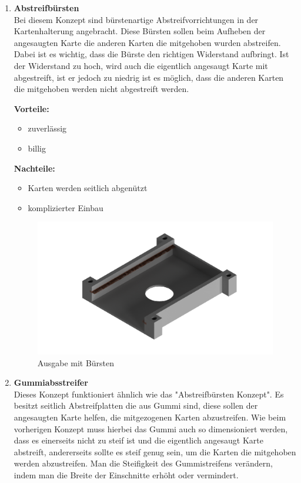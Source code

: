 \begin{enumerate}
    \item \textbf{Abstreifbürsten}\\


Bei diesem Konzept sind bürstenartige Abstreifvorrichtungen in der Kartenhalterung angebracht. Diese Bürsten sollen beim Aufheben der
angesaugten Karte die anderen Karten die mitgehoben wurden abstreifen. Dabei ist es wichtig, dass die Bürste den richtigen Widerstand aufbringt.
Ist der Widerstand zu hoch, wird auch die eigentlich angesaugt Karte mit abgestreift, ist er jedoch zu niedrig ist es möglich, dass die anderen Karten
die mitgehoben werden nicht abgestreift werden.

\textbf{Vorteile:}
\begin{itemize}
    \item zuverlässig
    \item billig
\end{itemize}
\textbf{Nachteile:}
\begin{itemize}
    \item Karten werden seitlich abgenützt
    \item komplizierter Einbau
\end{itemize}

\begin{figure}[H]
    \centering
    \includegraphics[scale=0.5,page=1]{fig/mech/AusgabeMitBuersten}
    \caption{Ausgabe mit Bürsten}
\end{figure}

    \item \textbf{Gummiabsstreifer}\\

Dieses Konzept funktioniert ähnlich wie das "Abstreifbürsten Konzept". Es besitzt seitlich Abstreifplatten die aus Gummi sind, diese
sollen der angesaugten Karte helfen, die mitgezogenen Karten abzustreifen. Wie beim vorherigen Konzept muss hierbei das Gummi auch so
dimensioniert werden, dass es einerseits nicht zu steif ist und die eigentlich angesaugt Karte abstreift, andererseits sollte es steif genug sein, um die Karten die mitgehoben werden abzustreifen. Man die Steifigkeit des Gummistreifens verändern, indem man die Breite der Einschnitte
erhöht oder vermindert.


\end{enumerate}
